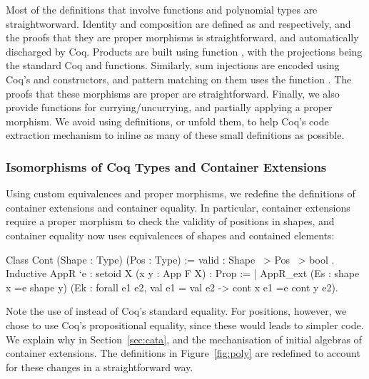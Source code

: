 \documentclass[anonymous, a4paper, UKenglish, cleveref, autoref, thm-restate]{lipics-v2021}
\begin{document}
Most of the definitions that involve functions and polynomial types are
straightworward.  Identity and composition are defined as 
 and  
respectively, and the proofs that they are proper morphisms is straightforward,
and automatically discharged by Coq. 
Products are built using function ,
with the projections being the standard Coq   and
 functions. Similarly, sum injections are encoded using
Coq's  and  constructors, and
pattern matching on them uses the function 
.
The proofs that these morphisms are proper are straightforward.  Finally, we
also provide functions for currying/uncurrying, and partially applying a proper
morphism. We avoid using definitions, or unfold them, to help Coq's code
extraction mechanism to inline as many of these small definitions as possible.

\subsubsection{Isomorphisms of Coq Types and Container Extensions}

Using custom equivalences and proper morphisms, we redefine the definitions of
container extensions and container equality. In particular, container
extensions require a proper morphism to check the validity of positions in
shapes, and container equality now uses equivalences of shapes and contained
elements: 
\begin{coqcode}
Class Cont (Shape : Type) (Pos : Type) := { valid : Shape ~> Pos ~> bool }.
Inductive AppR `{e : setoid X} (x y : App F X) : Prop :=
  | AppR_ext (Es : shape x =e shape y)
             (Ek : forall e1 e2, val e1 = val e2 -> cont x e1 =e cont y e2).
\end{coqcode}
Note the use of  instead of Coq's standard equality.  For
positions, however, we chose to use Coq's propositional equality, since these
would leads to simpler code. We explain why in Section~\ref{sec:cata}, and the
mechanisation of initial algebras of container extensions. The definitions in
Figure~\ref{fig:poly} are redefined to account for these changes in a
straightforward way.
\end{document}
